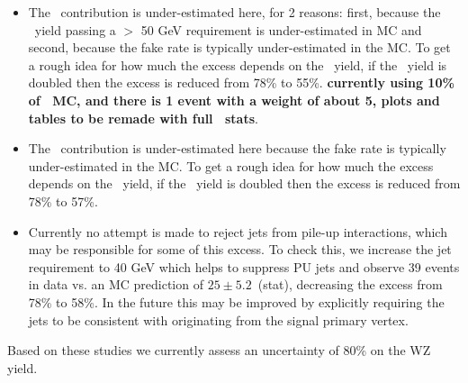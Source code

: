 \begin{itemize}

\item The \zjets\ contribution is under-estimated here, for 2 reasons: first, because the \zjets\
yield passing a \MET $>$ 50 GeV requirement is under-estimated in MC and second, because the fake
rate is typically under-estimated in the MC. To get a rough idea for how much the excess depends
on the \zjets\ yield, if the \zjets\ yield is doubled then the excess is reduced from 78\% to 55\%.
{\bf currently using 10\% of \zjets\ MC, and there is 1 event with a weight of about 5, plots and tables to be remade with full \zjets\ stats}.

\item The \ttbar\ contribution is under-estimated here because the fake
rate is typically under-estimated in the MC. To get a rough idea for how much the excess depends
on the \ttbar\ yield, if the \ttbar\ yield is doubled then the excess is reduced from 78\% to 57\%.

\item Currently no attempt is made to reject jets from pile-up interactions, which may be responsible
for some of this excess. To check this, we increase the jet \pt requirement to 40 GeV which
helps to suppress PU jets and observe 39 events in data vs. an MC prediction of $25\pm5.2$~(stat),
decreasing the excess from 78\% to 58\%. In the future this may be improved by explicitly
requiring the jets to be consistent with originating from the signal primary vertex.

\end{itemize}

Based on these studies we currently assess an uncertainty of 80\% on the WZ yield.

